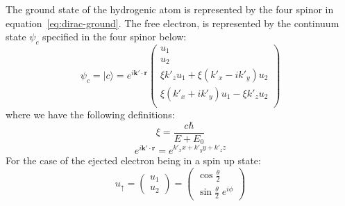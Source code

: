 \documentclass[a4paper,titlepage]{report}
\newcommand{\mb}[1]{\mathbf{#1}}
\newcommand{\ket}[1]{|#1 \rangle}
\begin{document}
	The ground state of the hydrogenic atom is represented by the four spinor in
	equation~\ref{eq:dirac-ground}. The free electron, is represented by the
	continuum state $\psi_c$ specified in the four spinor below:
	\begin{equation} \label{eq:continuum}
		\psi_c = \ket{c} =  e^{i \mb{k'} \cdot \mb{r} }
		\left(
			\begin{array}{c}
				u_1										\\
				u_2										\\
				\xi k'_z u_1 + \xi (k'_x - ik'_y) u_2	\\
				\xi (k'_x + ik'_y)u_1 - \xi k'_z u_2	\\
			\end{array}
		\right)
	\end{equation}
	where we have the following definitions:
	\begin{equation}
		\xi = \frac{c \hbar}{E + E_0}
	\end{equation}
	\begin{equation}
		e^{i \mb{k'} \cdot \mb{r}} =
		e^{k'_x x + k'_y y + k'_z z}
	\end{equation}
	For the case of the ejected electron being in a spin up state:
	\begin{equation}
		u_{\uparrow} = 
		\left(
			\begin{array}{c}
				u_1	\\
				u_2
			\end{array}
		\right)
		=
		\left(
			\begin{array}{c}
				\cos \frac{\theta}{2} 	\\
				\sin \frac{\theta}{2} \; e^{i\phi} 
			\end{array}
		\right)
	\end{equation}
\end{document}
